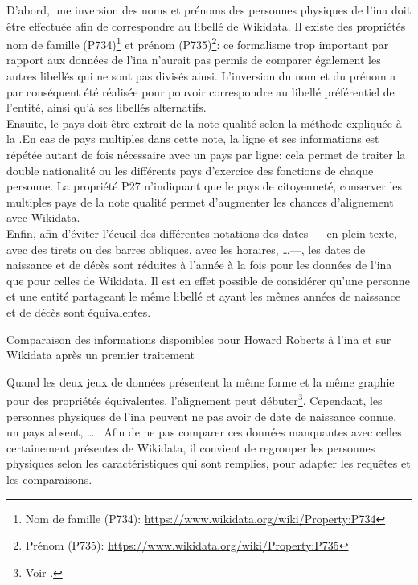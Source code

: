 D'abord, une inversion des noms et prénoms des personnes physiques de l'\ac{ina} doit être effectuée afin de correspondre au libellé de Wikidata. Il existe des propriétés nom de famille (P734)\footnote{Nom de famille (P734): \url{https://www.wikidata.org/wiki/Property:P734}} et prénom (P735)\footnote{Prénom (P735): \url{https://www.wikidata.org/wiki/Property:P735}}: ce formalisme trop important par rapport aux données de l'\ac{ina} n'aurait pas permis de comparer également les autres libellés qui ne sont pas divisés ainsi. L'inversion du nom et du prénom a par conséquent été réalisée pour pouvoir correspondre au libellé préférentiel de l'entité, ainsi qu'à ses libellés alternatifs.\\

Ensuite, le pays doit être extrait de la note qualité selon la méthode expliquée à la .En cas de pays multiples dans cette note, la ligne et ses informations est répétée autant de fois nécessaire avec un pays par ligne: cela permet de traiter la double nationalité ou les différents pays d'exercice des fonctions de chaque personne. La propriété P27 n'indiquant que le pays de citoyenneté, conserver les multiples pays de la note qualité permet d'augmenter les chances d'alignement avec Wikidata.\\

Enfin, afin d'éviter l'écueil des différentes notations des dates --- en plein texte, avec des tirets ou des barres obliques, avec les horaires, \dots ---, les dates de naissance et de décès sont réduites à l'année à la fois pour les données de l'\ac{ina} que pour celles de Wikidata. Il est en effet possible de considérer qu'une personne et une entité partageant le même libellé et ayant les mêmes années de naissance et de décès sont équivalentes.
\begin{table}[!h]
	\centering
	\caption{Comparaison des informations disponibles pour Howard Roberts à l'\ac{ina} et sur Wikidata après un premier traitement}
	\label{table_roberts_3}
\end{table}
\medskip

Quand les deux jeux de données présentent la même forme et la même graphie pour des propriétés équivalentes, l'alignement peut débuter\footnote{Voir .}. Cependant, les personnes physiques de l'\ac{ina} peuvent ne pas avoir de date de naissance connue, un pays absent, \dots~ Afin de ne pas comparer ces données manquantes avec celles certainement présentes de Wikidata, il convient de regrouper les personnes physiques selon les caractéristiques qui sont remplies, pour adapter les requêtes et les comparaisons.


